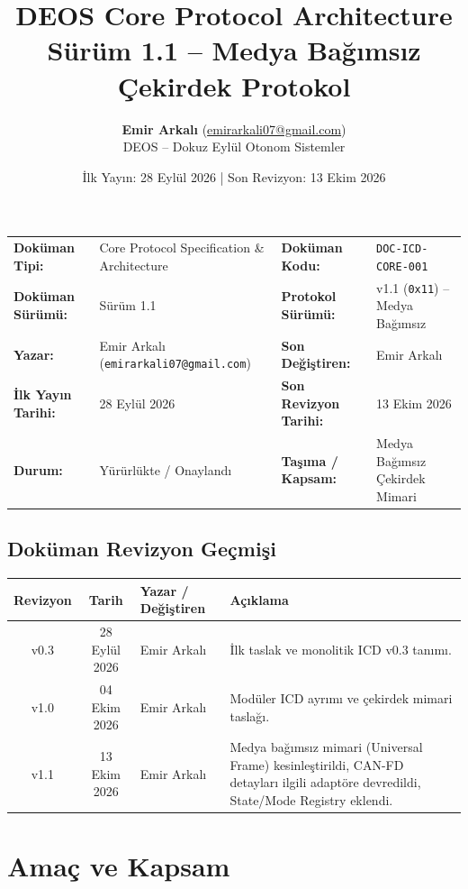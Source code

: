 \documentclass[a4paper,10pt]{article}
\title{\textbf{DEOS Core Protocol Architecture}\\
\large Sürüm 1.1 -- Medya Bağımsız Çekirdek Protokol}
\author{\textbf{Emir Arkalı} (\href{mailto:emirarkali07@gmail.com}{emirarkali07@gmail.com})\\DEOS -- Dokuz Eylül Otonom Sistemler}
\date{İlk Yayın: 28 Eylül 2026 \quad | \quad Son Revizyon: 13 Ekim 2026}
\newcommand{\hex}[1]{\texttt{0x#1}}
\newcommand{\code}[1]{\texttt{#1}}
\begin{document}
\maketitle

\begin{center}
\small
\begin{tabularx}{\textwidth}{ll lX}
\toprule
\textbf{Doküman Tipi:} & Core Protocol Specification \& Architecture & \textbf{Doküman Kodu:} & \code{DOC-ICD-CORE-001} \\
\textbf{Doküman Sürümü:} & Sürüm 1.1 & \textbf{Protokol Sürümü:} & v1.1 (\hex{11}) -- Medya Bağımsız \\
\textbf{Yazar:} & Emir Arkalı (\texttt{emirarkali07@gmail.com}) & \textbf{Son Değiştiren:} & Emir Arkalı \\
\textbf{İlk Yayın Tarihi:} & 28 Eylül 2026 & \textbf{Son Revizyon Tarihi:} & 13 Ekim 2026 \\
\textbf{Durum:} & Yürürlükte / Onaylandı & \textbf{Taşıma / Kapsam:} & Medya Bağımsız Çekirdek Mimari \\
\bottomrule
\end{tabularx}
\end{center}

\subsection*{Doküman Revizyon Geçmişi}
\begin{center}
\small
\begin{tabularx}{\textwidth}{c c l X}
\toprule
\textbf{Revizyon} & \textbf{Tarih} & \textbf{Yazar / Değiştiren} & \textbf{Açıklama} \\
\midrule
v0.3 & 28 Eylül 2026 & Emir Arkalı & İlk taslak ve monolitik ICD v0.3 tanımı. \\
v1.0 & 04 Ekim 2026 & Emir Arkalı & Modüler ICD ayrımı ve çekirdek mimari taslağı. \\
v1.1 & 13 Ekim 2026 & Emir Arkalı & Medya bağımsız mimari (Universal Frame) kesinleştirildi, CAN-FD detayları ilgili adaptöre devredildi, State/Mode Registry eklendi. \\
\bottomrule
\end{tabularx}
\end{center}
\vspace{0.8em}


\section{Amaç ve Kapsam}
\end{document}
